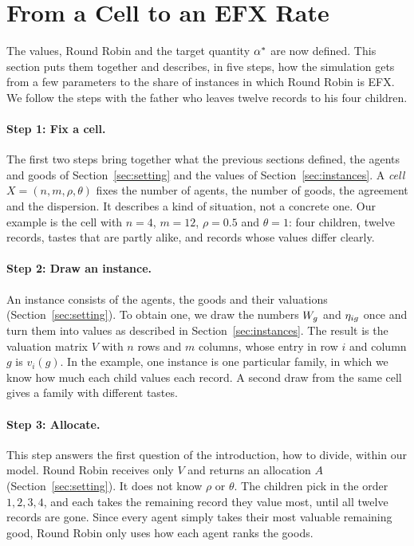 \section{From a Cell to an EFX Rate}\label{sec:evaluation}

The values, Round Robin and the target quantity $\alpha^{*}$ are now defined. This section puts them
together and describes, in five steps, how the simulation gets from a few parameters to the share
of instances in which Round Robin is EFX. We follow the steps with the father who leaves twelve
records to his four children.

\paragraph{Step 1: Fix a cell.}
The first two steps bring together what the previous sections defined, the agents and goods of
Section~\ref{sec:setting} and the values of Section~\ref{sec:instances}. A \textit{cell}
$X=(n,m,\rho,\theta)$ fixes the number of agents, the number of goods, the agreement and the
dispersion. It describes a kind of situation, not a concrete one. Our example is the cell with
$n=4$, $m=12$, $\rho=0.5$ and $\theta=1$: four children, twelve records, tastes that are partly
alike, and records whose values differ clearly.

\paragraph{Step 2: Draw an instance.}
An instance consists of the agents, the goods and their valuations (Section~\ref{sec:setting}). To
obtain one, we draw the numbers $W_g$ and $\eta_{ig}$ once and turn them into values as described in
Section~\ref{sec:instances}. The result is the valuation matrix $V$ with $n$ rows and $m$ columns,
whose entry in row $i$ and column $g$ is $v_i(g)$. In the example, one instance is one particular
family, in which we know how much each child values each record. A second draw from the same cell
gives a family with different tastes.

\paragraph{Step 3: Allocate.}
This step answers the first question of the introduction, how to divide, within our model. Round
Robin receives only $V$ and returns an allocation $A$ (Section~\ref{sec:setting}). It does not
know $\rho$ or $\theta$. The children pick in the order $1,2,3,4$, and each takes the remaining
record they value most, until all twelve records are gone. Since every agent simply takes their
most valuable remaining good, Round Robin only uses how each agent ranks the goods.

